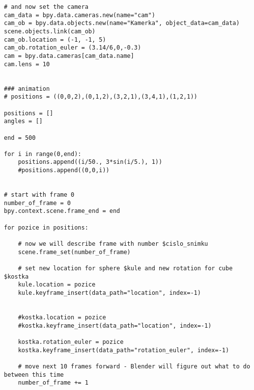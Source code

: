 \begin{verbatim}
# and now set the camera
cam_data = bpy.data.cameras.new(name="cam")  
cam_ob = bpy.data.objects.new(name="Kamerka", object_data=cam_data)  
scene.objects.link(cam_ob)  
cam_ob.location = (-1, -1, 5)  
cam_ob.rotation_euler = (3.14/6,0,-0.3)  
cam = bpy.data.cameras[cam_data.name]  
cam.lens = 10


### animation
# positions = ((0,0,2),(0,1,2),(3,2,1),(3,4,1),(1,2,1))

positions = []
angles = []

end = 500

for i in range(0,end):
    positions.append((i/50., 3*sin(i/5.), 1)) 
    #positions.append((0,0,i))


# start with frame 0
number_of_frame = 0  
bpy.context.scene.frame_end = end

for pozice in positions:

    # now we will describe frame with number $cislo_snimku
    scene.frame_set(number_of_frame)

    # set new location for sphere $kule and new rotation for cube $kostka
    kule.location = pozice
    kule.keyframe_insert(data_path="location", index=-1)


    #kostka.location = pozice
    #kostka.keyframe_insert(data_path="location", index=-1)

    kostka.rotation_euler = pozice
    kostka.keyframe_insert(data_path="rotation_euler", index=-1)

    # move next 10 frames forward - Blender will figure out what to do between this time
    number_of_frame += 1
\end{verbatim}
 

